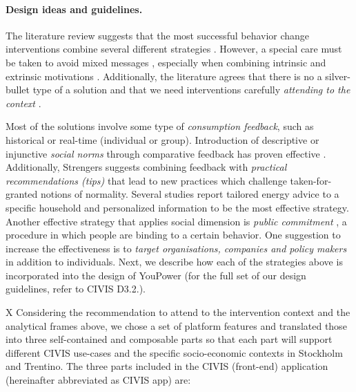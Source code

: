 \paragraph{Design ideas and guidelines.} The literature review suggests that the most successful behavior change interventions combine several different strategies \cite{gardner1996environmental,ockwell2009reorienting}. However, a special care must be taken to avoid mixed messages \cite{knowles2014patterns}, especially when combining intrinsic and extrinsic motivations \cite{delmas2013information}. Additionally, the literature agrees that there is no a silver-bullet type of a solution and that we need interventions carefully \textit{attending to the context} \cite{hargreaves2013keeping,dillahunt2014understanding}.

Most of the solutions involve some type of \textit{consumption feedback}, such as historical or real-time (individual or group). Introduction of descriptive or injunctive \textit{social norms} through comparative feedback has proven effective \cite{allcott2011social,cialdini2001harnessing,petkov2011motivating}. Additionally, Strengers \cite{strengers2011designing} suggests combining feedback with \textit{practical recommendations (tips)} that lead to new practices which challenge taken-for-granted notions of normality. Several studies \cite{abrahamse2005review,delmas2013information} report tailored energy advice to a specific household and personalized information to be the most effective strategy. Another effective strategy that applies social dimension is \textit{public commitment} \cite{abrahamse2005review}, a procedure in which people are binding to a certain behavior. One suggestion to increase the effectiveness is to \textit{target organisations, companies and policy makers} \cite{hasselqvist2015supporting,brynjarsdottir2012sustainably} in addition to individuals.
Next, we describe how each of the strategies above is incorporated into the design of YouPower (for the full set of our design guidelines, refer to CIVIS D3.2.).

X Considering the recommendation to attend to the intervention context and the analytical frames above, we chose a set of platform features and translated those into three self-contained and composable parts so that each part will support different CIVIS use-cases and the specific socio-economic contexts in Stockholm and Trentino. The three parts included in the CIVIS (front-end) application (hereinafter abbreviated as CIVIS app) are: 

